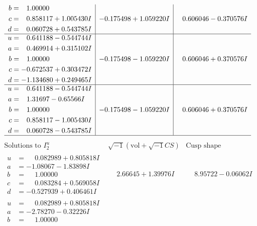 \documentclass[1p]{elsarticle_modified}
\theoremstyle{definition}
\newcommand{\I}{\sqrt{-1}}
\begin{document}
$$\begin{array}{c|c|c}
\begin{aligned}
b &= \phantom{-}1.00000\phantom{ +0.000000I} \\
c &= \phantom{-}0.858117 + 1.005430 I \\
d &= \phantom{-}0.060728 + 0.543785 I\end{aligned}
 & -0.175498 + 1.059220 I & \phantom{-}0.606046 - 0.370576 I \\ \hline\begin{aligned}
u &= \phantom{-}0.641188 - 0.544744 I \\
a &= \phantom{-}0.469914 + 0.315102 I \\
b &= \phantom{-}1.00000\phantom{ +0.000000I} \\
c &= -0.672537 + 0.303472 I \\
d &= -1.134680 + 0.249465 I\end{aligned}
 & -0.175498 - 1.059220 I & \phantom{-}0.606046 + 0.370576 I \\ \hline\begin{aligned}
u &= \phantom{-}0.641188 - 0.544744 I \\
a &= \phantom{-}1.31697 - 0.65566 I \\
b &= \phantom{-}1.00000\phantom{ +0.000000I} \\
c &= \phantom{-}0.858117 - 1.005430 I \\
d &= \phantom{-}0.060728 - 0.543785 I\end{aligned}
 & -0.175498 - 1.059220 I & \phantom{-}0.606046 + 0.370576 I\\
 \hline 
 \end{array}$$\newpage$$\begin{array}{c|c|c}  
\text{Solutions to }I^u_{2}& \I (\text{vol} + \sqrt{-1}CS) & \text{Cusp shape}\\
 \hline 
\begin{aligned}
u &= \phantom{-}0.082989 + 0.805818 I \\
a &= -1.08067 - 1.83898 I \\
b &= \phantom{-}1.00000\phantom{ +0.000000I} \\
c &= \phantom{-}0.083284 + 0.569058 I \\
d &= -0.527939 + 0.406461 I\end{aligned}
 & \phantom{-}2.66645 + 1.39976 I & \phantom{-}8.95722 - 0.06062 I \\ \hline\begin{aligned}
u &= \phantom{-}0.082989 + 0.805818 I \\
a &= -2.78270 - 0.32226 I \\
b &= \phantom{-}1.00000\phantom{ +0.000000I} \\

\end{aligned}
\end{array}$$
\end{document}
